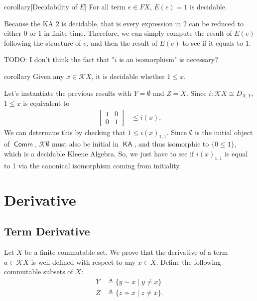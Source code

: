 \documentclass[a4paper,UKenglish,cleveref, autoref, thm-restate]{lipics-v2021}
\DeclareMathOperator{\KA}{\mathsf{KA}}
\DeclareMathOperator{\Comm}{\mathsf{Comm}}
\begin{document}
\begin{theoremEnd}{corollary}[Decidability of \(E\)]
  For all term \(e  \in  F X\), \(E(e) = 1\) is decidable.
\end{theoremEnd}

\begin{proofEnd}
  Because the KA \(2\) is decidable,
  that is every expression in \(2\) can be reduced to either \(0\) or \(1\) in finite time.
  Therefore, we can simply compute the result of \(E(e)\) following the structure of \(e\),
  and then the result of \(E(e)\) to see if it equals to \(1\).
\end{proofEnd}

TODO: I don't think the fact that "\(i\) is an isomorphism" is necessary?



\begin{theoremEnd}{corollary}
  \label{cor:unit-membership-decidability}
  Given any $x  \in  \mathcal{K}X$, it is decidable whether $1  \leq  x$.
\end{theoremEnd}

\begin{proofEnd}
  Let's instantiate the previous results with $Y =  \emptyset $ and $Z = X$.  Since $i :
  \mathcal{K}X  \cong  D_{X,Y}$, $1  \leq  x$ is equivalent to
  \begin{align*}
    \begin{bmatrix}
      1 & 0 \\
      0 & 1
    \end{bmatrix}
    &  \leq  i(x).
  \end{align*}
  We can determine this by checking that $1 \leq i(x)_{1,1}$.  Since
  $ \emptyset $ is the initial object of $\Comm$, $\mathcal{K} \emptyset $ must
  also be initial in $\KA$, and thus isomorphic to $\{0 \leq 1\}$, which is a
  decidable Kleene Algebra.  So, we just have to see if $i(x)_{1,1}$ is equal to
  1 via the canonical isomorphism coming from initiality.
\end{proofEnd}

\section{Derivative}
\label{sec:derivative}

\subsection{Term Derivative}

Let $X$ be a finite commutable set. We prove that the derivative of a term
$a  \in  \mathcal{K}X$ is well-defined with respect to any $x  \in  X$.  Define the following
commutable subsets of $X$:
\begin{align*}
  Y &  \triangleq  \{ y  \sim  x  \mid  y  \neq  x \} \\
  Z &  \triangleq  \{ z \mathrel{\not \sim } x  \mid  z  \neq  x \}.
\end{align*}
\end{document}
